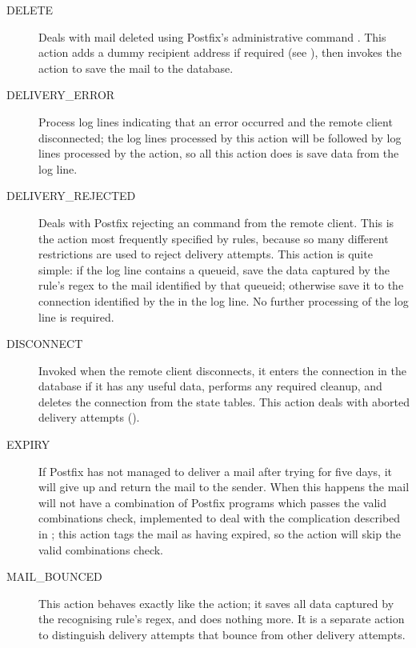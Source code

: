 \begin{description}
    \item [DELETE] Deals with mail deleted using Postfix's administrative
        command .  This action adds a dummy recipient
        address if required (see ), then invokes the  action to save the
        mail to the database.

    \item [DELIVERY\_ERROR] Process log lines indicating that an error
        occurred and the remote client disconnected; the log lines
        processed by this action will be followed by log lines processed by
        the  action, so all this action does is save
        data from the log line.

    \item [DELIVERY\_REJECTED] Deals with Postfix rejecting an
         command from the remote client.  This is the action
        most frequently specified by rules, because so many different
        restrictions are used to reject delivery attempts.  This action is
        quite simple: if the log line contains a queueid, save the data
        captured by the rule's regex to the mail identified by that
        queueid; otherwise save it to the connection identified by the
         in the log line.  No further processing of the log
        line is required.

    \item [DISCONNECT] Invoked when the remote client disconnects, it
        enters the connection in the database if it has any useful data,
        performs any required cleanup, and deletes the connection from the
        state tables.  This action deals with aborted delivery attempts
        ().

    \item [EXPIRY] If Postfix has not managed to deliver a mail after
        trying for five days, it will give up and return the mail to the
        sender.  When this happens the mail will not have a combination of
        Postfix programs which passes the valid combinations check,
        implemented to deal with the complication described in
        ; this action tags the mail as
        having expired, so the  action will skip the valid
        combinations check.

    \item [MAIL\_BOUNCED] This action behaves exactly like the
         action; it saves all data captured by the
        recognising rule's regex, and does nothing more.  It is a separate
        action to distinguish delivery attempts that bounce from other
        delivery attempts.


\end{description}
